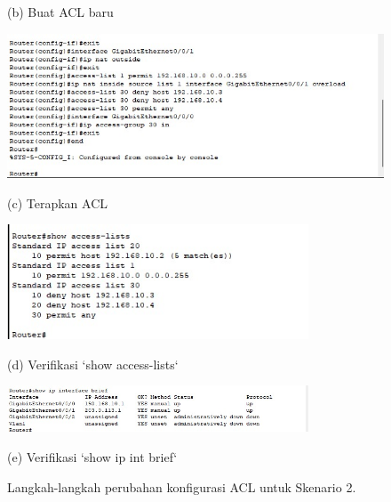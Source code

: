 \begin{enumerate}
\begin{figure}[H]
\begin{minipage}{0.32\textwidth}
            \caption*{(b) Buat ACL baru}
        \end{minipage}\hfill
        \begin{minipage}{0.32\textwidth}
            \centering
            \includegraphics[width=\textwidth]{img4/ApplyACL30.jpeg}
            \caption*{(c) Terapkan ACL}
        \end{minipage}
        \vspace{1em} 
        \begin{minipage}{0.48\textwidth}
            \centering
            \includegraphics[width=0.8\textwidth]{img4/Verifconf.jpeg}
            \caption*{(d) Verifikasi `show access-lists`}
        \end{minipage}\hfill
        \begin{minipage}{0.48\textwidth}
            \centering
            \includegraphics[width=0.8\textwidth]{img4/VerifInt.jpeg}
            \caption*{(e) Verifikasi `show ip int brief`}
        \end{minipage}
        \caption{Langkah-langkah perubahan konfigurasi ACL untuk Skenario 2.}
    \end{figure}
    

\end{enumerate}
